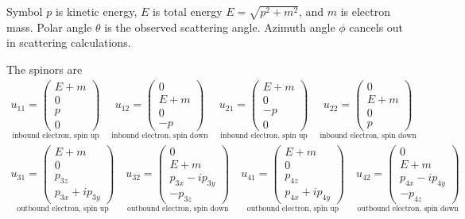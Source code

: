 \documentclass[12pt]{article}
\begin{document}
\noindent
Symbol $p$ is kinetic energy,
$E$ is total energy $E=\sqrt{p^2+m^2}$,
and $m$ is electron mass.
Polar angle $\theta$ is the observed scattering angle.
Azimuth angle $\phi$ cancels out in scattering calculations.

\bigskip
\noindent
The spinors are
\begin{gather*}
\underset{\text{inbound electron, spin up}}
{u_{11}=\begin{pmatrix}E+m\\0\\p\\0\end{pmatrix}}
\quad
\underset{\text{inbound electron, spin down}}
{u_{12}=\begin{pmatrix}0\\E+m\\0\\-p\end{pmatrix}}
\quad
\underset{\text{inbound electron, spin up}}
{u_{21}=\begin{pmatrix}E+m\\0\\-p\\0\end{pmatrix}}
\quad
\underset{\text{inbound electron, spin down}}
{u_{22}=\begin{pmatrix}0\\E+m\\0\\p\end{pmatrix}}
\\
\underset{\text{outbound electron, spin up}}
{u_{31}=\begin{pmatrix}E+m\\0\\p_{3z}\\p_{3x}+ip_{3y}\end{pmatrix}}
\quad
\underset{\text{outbound electron, spin down}}
{u_{32}=\begin{pmatrix}0\\E+m\\p_{3x}-ip_{3y}\\-p_{3z}\end{pmatrix}}
\quad
\underset{\text{outbound electron, spin up}}
{u_{41}=\begin{pmatrix}E+m\\0\\p_{4z}\\p_{4x}+ip_{4y}\end{pmatrix}}
\quad
\underset{\text{outbound electron, spin down}}
{u_{42}=\begin{pmatrix}0\\E+m\\p_{4x}-ip_{4y}\\-p_{4z}\end{pmatrix}}
\end{gather*}
\end{document}
